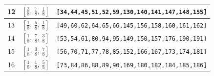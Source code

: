 \documentclass[fleqn,8pt]{jsarticle}
\begin{document}
\begin{longtable}{ccc}
12 & $\left[ \frac{3}{8},\, \frac{7}{8},\, \frac{1}{8} \right]$ & {\tt [34,44,45,51,52,59,130,140,141,147,148,155]} \\ \hline
13 & $\left[ \frac{1}{8},\, \frac{5}{8},\, \frac{1}{8} \right]$ & {\tt [49,60,62,64,65,66,145,156,158,160,161,162]} \\ \hline
14 & $\left[ \frac{1}{8},\, \frac{7}{8},\, \frac{3}{8} \right]$ & {\tt [53,54,61,80,94,95,149,150,157,176,190,191]} \\ \hline
15 & $\left[ \frac{1}{8},\, \frac{3}{8},\, \frac{7}{8} \right]$ & {\tt [56,70,71,77,78,85,152,166,167,173,174,181]} \\ \hline
16 & $\left[ \frac{1}{8},\, \frac{1}{8},\, \frac{5}{8} \right]$ & {\tt [73,84,86,88,89,90,169,180,182,184,185,186]} \\
\end{longtable}
\renewcommand{\arraystretch}{1.2}
\end{document}
